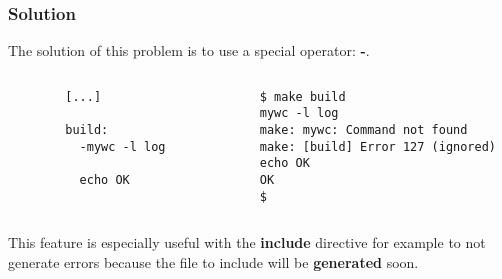 \documentclass[8pt]{beamer}
\newcommand{\nl}[0]{\vspace{0.4cm}}
\begin{document}

\begin{frame}[containsverbatim]
  \frametitle{Solution}

  The solution of this problem is to use a special operator: \textbf{-}.

  \begin{columns}

    \begin{column}{6cm}
      \begin{verbatim}
        [...]

        build:
          -mywc -l log

          echo OK
      \end{verbatim}
    \end{column}

    \begin{column}{6cm}
      \begin{verbatim}
        $ make build
        mywc -l log
        make: mywc: Command not found
        make: [build] Error 127 (ignored)
        echo OK
        OK
        $ 
      \end{verbatim}
    \end{column}

  \end{columns}

  \nl

  This feature is especially useful with the \textbf{include} directive
  for example to not generate errors because the file to include will
  be \textbf{generated} soon.
\end{frame}

\end{document}

